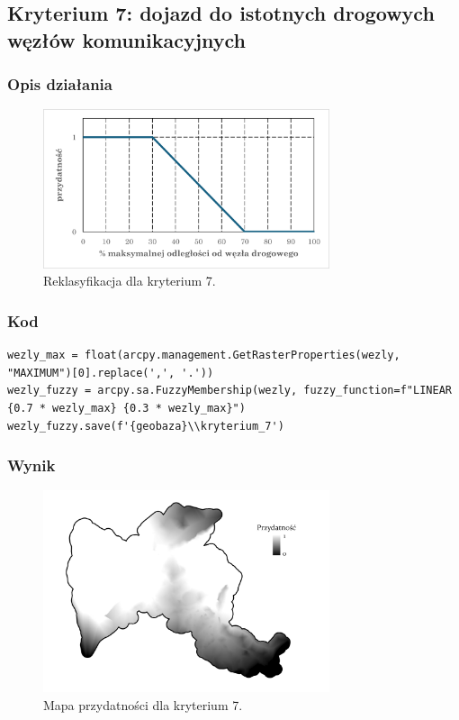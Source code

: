 \documentclass{article}
\begin{document}
\newpage
\subsection{Kryterium 7: dojazd do istotnych drogowych węzłów komunikacyjnych}
\subsubsection{Opis działania}
\begin{figure}[H]
    \centering
    \includegraphics[width=0.75\textwidth]{img/kryterium7-wykres-glowny.png}
    \caption*{Reklasyfikacja dla kryterium 7.}
\end{figure}


\subsubsection{Kod}
\begin{lstlisting}
wezly_max = float(arcpy.management.GetRasterProperties(wezly, "MAXIMUM")[0].replace(',', '.'))
wezly_fuzzy = arcpy.sa.FuzzyMembership(wezly, fuzzy_function=f"LINEAR {0.7 * wezly_max} {0.3 * wezly_max}")
wezly_fuzzy.save(f'{geobaza}\\kryterium_7')
\end{lstlisting}

\subsubsection{Wynik}

\begin{figure}[H]
    \centering
    \includegraphics[width=0.75\textwidth]{img/kryterium7-layout.jpg}
    \caption*{Mapa przydatności dla kryterium 7.}
\end{figure}
\end{document}
